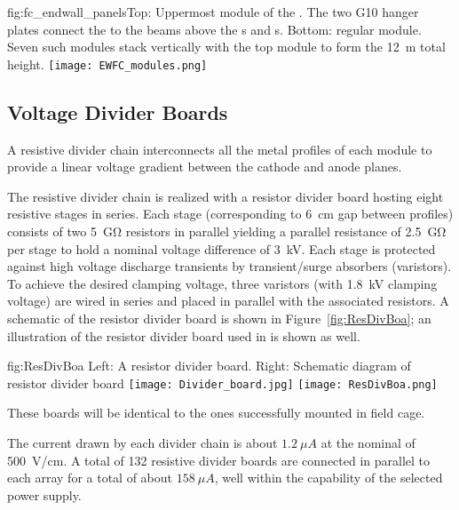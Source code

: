 \begin{dunefigure}{fig:fc_endwall_panels}{Top: Uppermost module of the . The two G10 hanger plates connect the  to the  beams above the s and s. Bottom: regular  module. Seven such modules stack vertically with the top module to form the \SI{12}{m} total height.}
\texttt{[image: EWFC\_modules.png]}
\end{dunefigure}



\subsection{Voltage Divider Boards}
\label{sec:fdsp-hv-des-fc-vdb}

A resistive divider chain interconnects all the metal profiles of each  module to provide a linear voltage gradient between the cathode and anode planes.

The resistive divider chain is realized with a resistor divider board hosting eight resistive stages in series. Each stage (corresponding to \SI{6}{cm} gap between  profiles)  consists of two \SI{5}{\giga\ohm} resistors in parallel yielding a parallel resistance of \SI{2.5}{\giga\ohm} per stage to hold a nominal voltage difference of \SI{3}{kV}. Each stage is protected against high voltage discharge transients by transient/surge absorbers (varistors). To achieve the desired clamping voltage, three varistors (with \SI{1.8}{kV} clamping voltage) are wired in series and placed in parallel with the associated resistors. A schematic of the resistor divider board is shown in Figure~\ref{fig:ResDivBoa}; an illustration of the resistor divider board used in  is shown as well.

\begin{dunefigure}{fig:ResDivBoa}
  {Left: A  resistor divider board. Right: Schematic diagram of resistor divider board}
  \texttt{[image: Divider\_board.jpg]}
  \texttt{[image: ResDivBoa.png]}
\end{dunefigure}

These boards will be identical to the ones successfully mounted in  field cage. 

The current drawn by each divider chain is about $1.2~\mu A$ at the nominal \efield{} of \SI{500}{V/cm}. A total of 132 resistive divider 
boards are connected in parallel to each  array for a total of about $158~\mu A$, well within the capability of the selected  power supply.

